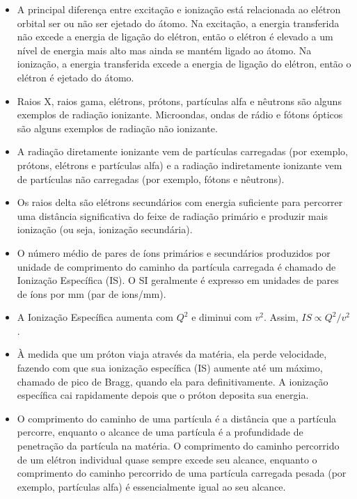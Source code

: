 \documentclass[11pt,a4paper]{article}
\newcounter{exemplo}
\begin{document}
\begin{exemplo}
\begin{itemize}
        \item A principal diferença entre excitação e ionização está relacionada ao elétron orbital ser ou não ser ejetado do átomo. Na excitação, a energia transferida não excede a energia de ligação do elétron, então o elétron é elevado a um nível de energia mais alto mas ainda se mantém ligado ao átomo. Na ionização, a energia transferida excede a energia de ligação do elétron, então o elétron é ejetado do átomo.
        
        \item Raios X, raios gama, elétrons, prótons, partículas alfa e nêutrons são alguns exemplos de radiação ionizante. Microondas, ondas de rádio e fótons ópticos são alguns exemplos de radiação não ionizante.
        
        \item A radiação diretamente ionizante vem de partículas carregadas (por exemplo, prótons, elétrons e partículas alfa) e a radiação indiretamente ionizante vem de partículas não carregadas (por exemplo, fótons e nêutrons).
        
        \item Os raios delta são elétrons secundários com energia suficiente para percorrer uma distância significativa do feixe de radiação primário e produzir mais ionização (ou seja, ionização secundária).
        
        \item O número médio de pares de íons primários e secundários produzidos por unidade de comprimento do caminho da partícula carregada é chamado de Ionização Específica (IS). O SI geralmente é expresso em unidades de pares de íons por mm (par de ions/mm).
        
        \item A  Ionização Específica aumenta com $Q^2$ e diminui com $v^2$. Assim, $IS \propto Q^2/v^2$.
        
        \item À medida que um próton viaja através da matéria, ela perde velocidade, fazendo com que sua ionização específica (IS) aumente até um máximo, chamado de pico de Bragg, quando ela para definitivamente. A ionização específica cai rapidamente depois que o próton deposita sua energia.
        
        \item O comprimento do caminho de uma partícula é a distância que a partícula percorre, enquanto o alcance de uma partícula é a profundidade de penetração da partícula na matéria. O comprimento do caminho percorrido de um elétron individual quase sempre excede seu alcance, enquanto o comprimento do caminho percorrido de uma partícula carregada pesada (por exemplo, partículas alfa) é essencialmente igual ao seu alcance.
        

\end{itemize}
\end{exemplo}
\end{document}
